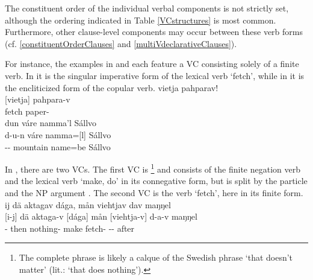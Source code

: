 \FB
The constituent order of the individual verbal components is not strictly set, although the ordering indicated in Table \vref{VCstructures} is most common. Furthermore, other clause-level components may occur between these verb forms (cf. \SEC\ref{constituentOrderClauses} and \SEC\ref{multiVdeclarativeClauses}). 

For instance, the examples in  and  each feature a VC consisting solely of a finite verb. In  it is the singular imperative form of the lexical verb  ‘fetch’, while in  it is the encliticized  form of the copular verb. %
\ea\label{VCex1}
\glll	vietja pahparav!\\
	{[vietja]\subVC} pahpara-v\\
	fetch\BS{} paper-\\\nopagebreak
{}	
\z
\ea\label{VCex2}
\glll	dun váre namma'l Sállvo\\
	d-u-n váre {namma=[l]\subVC} Sállvo\\
	-- mountain\BS{} name\BS{}=be\BS{} Sállvo\BS{}\\\nopagebreak
{}	
\z

In , there are two VCs. The first VC is %
\footnote{The complete phrase  is likely a calque of the Swedish phrase  ‘that doesn’t matter’ (lit.: ‘that does nothing’).} %
and consists of the finite negation verb and the lexical verb  ‘make, do’ in its connegative form, but is split by the particle  and the NP argument . The second VC is the verb  ‘fetch’, here in its  finite form. 
\ea\label{VCex3}
\glll	ij dä aktagav dága, mån viehtjav dav maŋŋel\\
	{[i-j]\subVC{}} dä aktaga-v {[dága]\subVC{}} mån {[viehtja-v]\subVC{}} d-a-v maŋŋel\\
	- then nothing- make\BS{}  fetch- -- after\\\nopagebreak
{}	
\z

